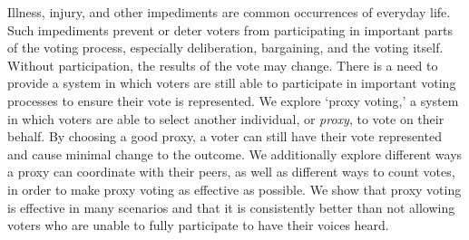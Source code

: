 %
%
%

\begin{publicabstract}

    Illness, injury, and other impediments are common occurrences of everyday life.
    Such impediments prevent or deter voters from participating in important parts
    of the voting process, especially deliberation, bargaining, and the voting
    itself.
    Without participation, the results of the vote may change.
    There is a need to provide a system in which voters are still able to
    participate in important voting processes to ensure their vote is represented.
    We explore `proxy voting,' a system in which voters are able to select another
    individual, or \textit{proxy}, to vote on their behalf.
    By choosing a good proxy, a voter can still have their vote represented and cause minimal change to the outcome.
    We additionally explore different ways a proxy can coordinate with their peers,
    as well as different ways to count votes, in order to make proxy voting as
    effective as possible.
    We show that proxy voting is effective in many scenarios and that it is
    consistently better than not allowing voters who are unable to fully participate to
    have their voices heard.

\end{publicabstract}


